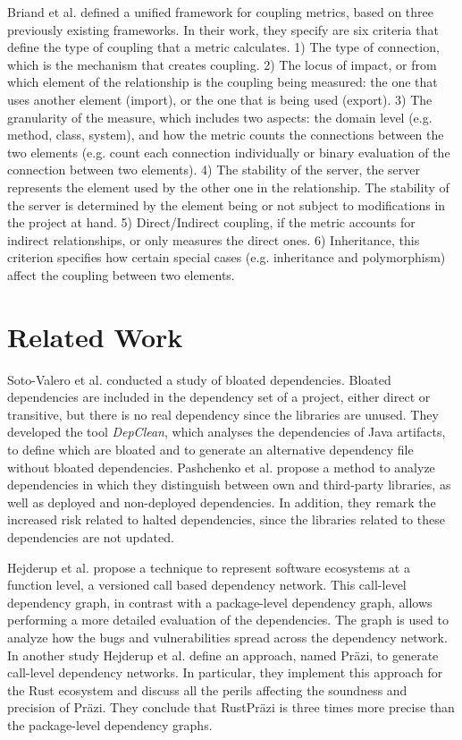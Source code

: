 \documentclass[a4paper]{article}
\begin{document}
Briand et al. \cite{briand1999unified} defined a unified framework for coupling metrics, based on three previously existing frameworks. In their work, they specify are six criteria that define the type of coupling that a metric calculates. 1) The type of connection, which is the mechanism that creates coupling. 2) The locus of impact, or from which element of the relationship is the coupling being measured: the one that uses another element (import), or the one that is being used (export). 3) The granularity of the measure, which includes two aspects: the domain level (e.g. method, class, system), and how the metric counts the connections between the two elements (e.g. count each connection individually or binary evaluation of the connection between two elements). 4) The stability of the server, the server represents the element used by the other one in the relationship. The stability of the server is determined by the element being or not subject to modifications in the project at hand. 5) Direct/Indirect coupling, if the metric accounts for indirect relationships, or only measures the direct ones. 6) Inheritance, this criterion specifies how certain special cases (e.g. inheritance and polymorphism) affect the coupling between two elements.

\section{Related Work}
Soto-Valero et al. \cite{soto2020comprehensive} conducted a study of bloated dependencies. Bloated dependencies are included in the dependency set of a project, either direct or transitive, but there is no real dependency since the libraries are unused. They developed the tool \textit{DepClean}, which analyses the dependencies of Java artifacts, to define which are bloated and to generate an alternative dependency file without bloated dependencies. Pashchenko et al. \cite{pashchenko2018vulnerable} propose a method to analyze dependencies in which they distinguish between own and third-party libraries, as well as deployed and non-deployed dependencies. In addition, they remark the increased risk related to halted dependencies, since the libraries related to these dependencies are not updated.

Hejderup et al. \cite{hejderup2018software} propose a technique to represent software ecosystems at a function level, a versioned call based dependency network. This call-level dependency graph, in contrast with a package-level dependency graph, allows performing a more detailed evaluation of the dependencies. The graph is used to analyze how the bugs and vulnerabilities spread across the dependency network. In another study Hejderup et al. \cite{hejderup2018prazi} define an approach, named Präzi, to generate call-level dependency networks. In particular, they implement this approach for the Rust ecosystem and discuss all the perils affecting the soundness and precision of Präzi. They conclude that RustPräzi is three times more precise than the package-level dependency graphs.
\end{document}
